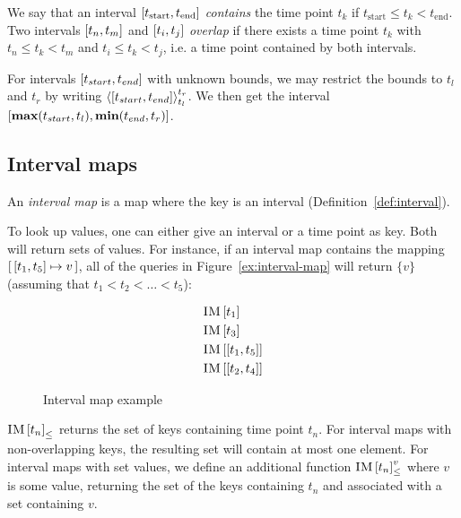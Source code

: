 We say that an interval $\interval{t_\text{start}}{t_\text{end}}$ \emph{contains} the time point $t_k$ if $t_\text{start} \leq t_k < t_\text{end}$. Two intervals $\interval{t_n}{t_m}$ and $\interval{t_i}{t_j}$ \emph{overlap} if there exists a time point $t_k$ with $t_n \leq t_k < t_m$ and $t_i \leq t_k < t_j$, i.e. a time point contained by both intervals.

For intervals $\interval{t_{start}}{t_{end}}$ with unknown bounds, we may restrict the bounds to $t_l$ and $t_r$ by writing $\clamp{\interval{t_{start}}{t_{end}}}{t_l}{t_r}$. We then get the interval $\interval{\textbf{max}(t_{start}, t_l)}{\textbf{min}(t_{end}, t_r)}$.

\subsection{Interval maps}
\label{sub:interval-maps}
\begin{definition}
An \emph{interval map} is a map where the key is an interval (Definition~\vref{def:interval}). 
  \label{def:interval-map}
\end{definition}

To look up values, one can either give an interval or a time point as key. Both will return sets of values. For instance, if an interval map  contains the mapping $\intervalmapping{t_1}{t_5}{v}$, all of the queries in Figure~\vref{ex:interval-map} will return $\{v\}$ (assuming that $t_1 < t_2 < \ldots < t_5$):

\begin{figure}[h]
  \begin{align*}
    & \lookup{\map{IM}}{t_1} \\
    & \lookup{\map{IM}}{t_3} \\
    & \lookup{\map{IM}}{\interval{t_1}{t_5}} \\
    & \lookup{\map{IM}}{\interval{t_2}{t_4}}
  \end{align*}
  \caption{Interval map example}
  \label{ex:interval-map}
\end{figure}

${\textsc{IM} \left[ t_n \right]}_{\leq}$ returns the set of keys containing time point $t_n$. For interval maps with non-overlapping keys, the resulting set will contain at most one element. For interval maps with set values, we define an additional function ${\textsc{IM} \left[ t_n \right]^{v}_{\leq}}$ where $v$ is some value, returning the set of the keys containing $t_n$ and associated with a set containing $v$. 


